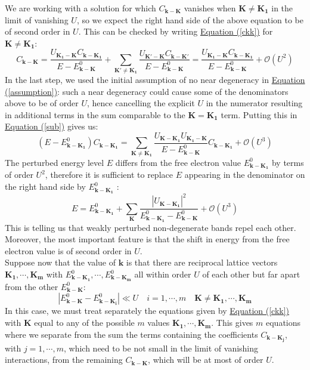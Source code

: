 \documentclass[10.75pt,a4paper,openright,bottom=2cm]{article}
\renewcommand{\Vec}[1]{\boldsymbol{#1}}
\renewcommand{\refeq}[1]{\hyperref[#1]{Equation (\ref{#1})}}
\begin{document}
We are working with a solution for which $C_{\Vec{k}-\Vec{K}}$ vanishes when $\Vec{K}\neq\Vec{K_1}$ in the limit of vanishing $U$, so we expect the right hand side of the above equation to be of second order in $U$. This can be checked by writing \hyperref[ckk]{Equation (\ref{ckk})} for $\Vec{K}\neq\Vec{K_1}$:
\[
C_{\Vec{k}-\Vec{K}}=\frac{U_{\Vec{K_1}-\Vec{K}}C_{\Vec{k}-\Vec{K_1}}}{E-E^0_{\Vec{k}-\Vec{K}}}+\sum_{\Vec{K'}\neq\Vec{K_1}}\frac{U_{\Vec{K'}-\Vec{K}}C_{\Vec{k}-\Vec{K'}}}{E-E^0_{\Vec{k}-\Vec{K}}}=\frac{U_{\Vec{K_1}-\Vec{K}}C_{\Vec{k}-\Vec{K_1}}}{E-E^0_{\Vec{k}-\Vec{K}}}+\mathcal{O}(U^2)
\]
In the last step, we used the initial assumption of no near degeneracy in \hyperref[assumption]{Equation (\ref{assumption})}: such a near degeneracy could cause some of the denominators above to be of order $U$, hence cancelling the explicit $U$ in the numerator resulting in additional terms in the sum comparable to the $\Vec{K}=\Vec{K_1}$ term. Putting this in \refeq{sub} gives us:
\begin{equation}
\label{nodeg}
(E-E^0_{\Vec{k}-\Vec{K_1}})C_{\Vec{k}-\Vec{K_1}}=\sum_{\Vec{K}\neq\Vec{K_1}}\frac{U_{\Vec{K}-\Vec{K_1}}U_{\Vec{K_1}-\Vec{K}}}{E-E^0_{\Vec{k}-\Vec{K}}}C_{\Vec{k}-\Vec{K_1}}+\mathcal{O}(U^3)
\end{equation}
The perturbed energy level $E$ differs from the free electron value $E^0_{\Vec{k}-\Vec{K_1}}$ by terms of order $U^2$, therefore it is sufficient to replace $E$ appearing in the denominator on the right hand side by $E^0_{\Vec{k}-\Vec{K_1}}$ :
\[
E=E^0_{\Vec{k}-\Vec{K_1}}+\sum_{\Vec{K}}\frac{|U_{\Vec{K}-\Vec{K_1}}|^2}{E^0_{\Vec{k}-\Vec{K_1}}-E^0_{\Vec{k}-\Vec{K}}}+\mathcal{O}(U^3)
\]
This is telling us that weakly perturbed non-degenerate bands repel each other. Moreover, the most important feature is that the shift in energy from the free electron value is of second order in $U$.\\
Suppose now that the value of $\Vec{k}$ is that there are reciprocal lattice vectors $\Vec{K_1},\cdots, \Vec{K_m}$ with $E^0_{\Vec{k}-\Vec{K_1}},\cdots,E^0_{\Vec{k}-\Vec{K_m}}$ all within order $U$ of each other but far apart from the other $E^0_{\Vec{k}-\Vec{K}}$:
\[
|E^0_{\Vec{k}-\Vec{K}}-E^0_{\Vec{k}-\Vec{K_i}}|\ll U \quad i=1,\cdots,m \quad \Vec{K}\neq\Vec{K_1},\cdots,\Vec{K_m}
\]
In this case, we must treat separately the equations given by \refeq{ckk} with $\Vec{K}$ equal to any of the possible $m$ values $\Vec{K_1},\cdots,\Vec{K_m}$. This gives $m$ equations where we separate from the sum the terms containing the coefficients $C_{\Vec{k}-\Vec{K_j}}$, with $j=1,\cdots,m$, which need to be not small in the limit of vanishing interactions, from the remaining $C_{\Vec{k}-\Vec{K}}$, which will be at most of order $U$.
\end{document}

